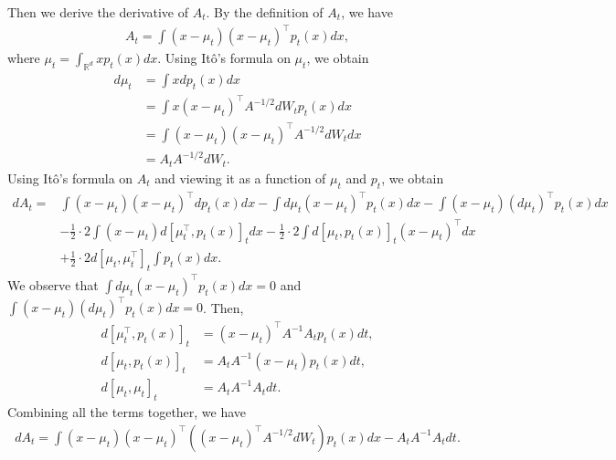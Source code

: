 \documentclass[11pt,twoside]{article}
\newcommand{\co}{A}
\theoremstyle{named}
\theoremstyle{plain}
\newcommand{\usedim}{\ensuremath{d}}
\newcommand{\dims}{\usedim}
\newcommand{\real}{\ensuremath{\mathbb{R}}}
\newcommand{\brackets}[1]{\left[ #1 \right]}
\newcommand{\parenth}[1]{\left( #1 \right)}
\newcommand{\tp}{^\top}
\begin{document}
Then we derive the derivative of $A_t$. By the definition of $A_t$, we have
\begin{align*}
  A_t = \int \parenth{x - \mu_t} \parenth{x - \mu_t}\tp p_t(x) dx,
\end{align*}
where $\mu_t = \int_{\real^\dims} x p_t(x) dx$. Using It\^o's formula on $\mu_t$, we obtain
\begin{align*}
  d\mu_t &= \int x d p_t(x) dx \\
  &= \int x (x- \mu_t)\tp \co^{-1/2} dW_t p_t(x) dx \\
  &= \int (x - \mu_t) (x- \mu_t)\tp \co^{-1/2} dW_t dx\\
  &= A_t \co^{-1/2} dW_t.
\end{align*}
Using It\^o's formula on $A_t$ and viewing it as a function of $\mu_t$ and $p_t$, we obtain
\begin{align*}
  dA_t =& \int \parenth{x - \mu_t}\parenth{x - \mu_t}\tp dp_t(x) dx - \int d\mu_t\parenth{x - \mu_t}\tp p_t(x) dx - \int \parenth{x - \mu_t}\parenth{d\mu_t}\tp p_t(x) dx \\
  &-\frac{1}{2}\cdot 2 \int \parenth{x - \mu_t} d\brackets{\mu_t\tp, p_t(x)}_t dx - \frac{1}{2}\cdot 2 \int  d\brackets{\mu_t, p_t(x)}_t \parenth{x - \mu_t}\tp  dx \\
  &+ \frac{1}{2} \cdot 2 d\brackets{\mu_t, \mu_t\tp}_t \int p_t(x) dx.
\end{align*}
We observe that $\int d\mu_t\parenth{x - \mu_t}\tp p_t(x) dx = 0$ and $\int \parenth{x - \mu_t}\parenth{d\mu_t}\tp p_t(x) dx = 0$. Then,
\begin{align*}
  d\brackets{\mu_t\tp, p_t(x)}_t &= \parenth{x - \mu_t}\tp \co^{-1} A_t p_t(x) dt,\\
  d\brackets{\mu_t, p_t(x)}_t &= A_t  \co^{-1} \parenth{x - \mu_t} p_t(x) dt, \\
  d\brackets{\mu_t, \mu_t}_t &= A_t A^{-1} A_t dt.
\end{align*}
Combining all the terms together, we have
\begin{align*}
  dA_t = \int \parenth{x - \mu_t} \parenth{x - \mu_t}\tp \parenth{\parenth{x-\mu_t}\tp \co^{-1/2} dW_t} p_t(x) dx - A_t\co^{-1} A_t dt.
\end{align*}
\end{document}
